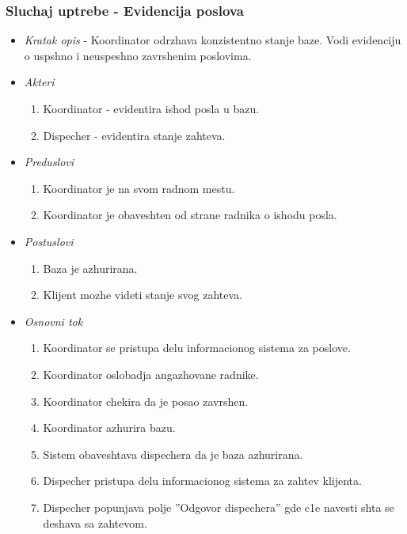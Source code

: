\documentclass[10 pt]{article}
\begin{document}
	\subsubsection{Sluchaj uptrebe - Evidencija poslova}
	
		\begin{itemize}
			\item\textit{Kratak opis} - Koordinator odrzhava konzistentno stanje baze. Vodi evidenciju o uspshno i neuspeshno zavrshenim poslovima.
			
			\item\textit{Akteri}
				\begin{enumerate}
					\item Koordinator - evidentira is{h}od posla u bazu.
					\item Dispecher - evidentira stanje zahteva.
				\end{enumerate}
			
			\item\textit{Preduslovi}
				\begin{enumerate}
					\item Koordinator je na svom radnom mestu.
					\item Koordinator je obaveshten od strane radnika o is{h}odu posla.
				\end{enumerate}
		
			\item\textit{Postuslovi}
				\begin{enumerate}
					\item Baza je azhurirana. 
					\item Klijent mozhe videti stanje svog zahteva.
				\end{enumerate}
		
			\item\textit{Osnovni tok}
				\begin{enumerate}
					\item Koordinator se pristupa delu informacionog sistema za poslove.
					\item Koordinator oslobadja angazhovane radnike.
					\item Koordinator chekira da je posao zavrshen.
					\item Koordinator azhurira bazu.
					\item Sistem obaveshtava dispechera da je baza azhurirana.
					\item Dispecher pristupa delu informacionog sistema za zahtev klijenta.
					\item Dispecher popunjava polje ''Odgovor dispechera'' gde c1e navesti shta se deshava sa zahtevom.				
				\end{enumerate}
			

\end{itemize}
\end{document}
